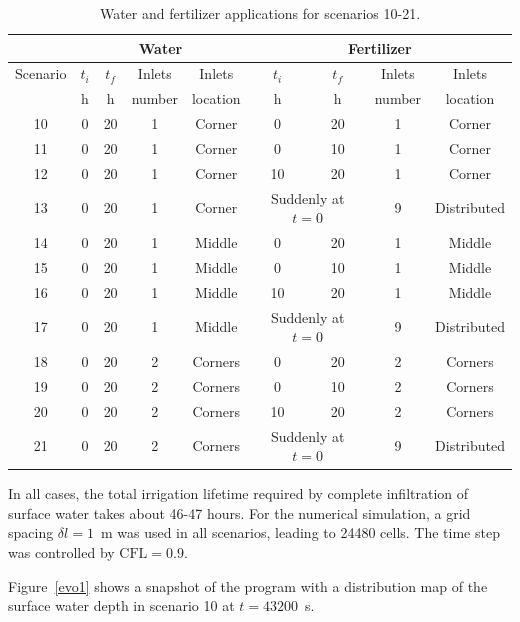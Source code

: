 \documentclass[review,authoryear]{elsarticle}
\begin{document}
\begin{table}[ht!]
\centering
\caption{Water and fertilizer applications for scenarios 10-21.
\label{TabNetwork}}
\footnotesize
\begin{tabular}{|c|cccc|cccc|}
\hline
&\multicolumn{4}{|c|}{Water}&\multicolumn{4}{|c|}{Fertilizer}\\
\hline
Scenario&$t_i$&$t_f$&Inlets&Inlets&$t_i$&$t_f$&Inlets&Inlets\\
&h&h&number&location&h&h&number&location\\
\hline
10&0&20&1&Corner&0&20&1&Corner\\
11&0&20&1&Corner&0&10&1&Corner\\
12&0&20&1&Corner&10&20&1&Corner\\
13&0&20&1&Corner&\multicolumn{2}{c}{Suddenly at $t=0$}&9&Distributed\\
14&0&20&1&Middle&0&20&1&Middle\\
15&0&20&1&Middle&0&10&1&Middle\\
16&0&20&1&Middle&10&20&1&Middle\\
17&0&20&1&Middle&\multicolumn{2}{c}{Suddenly at $t=0$}&9&Distributed\\
18&0&20&2&Corners&0&20&2&Corners\\
19&0&20&2&Corners&0&10&2&Corners\\
20&0&20&2&Corners&10&20&2&Corners\\
21&0&20&2&Corners&\multicolumn{2}{c}{Suddenly at $t=0$}&9&Distributed\\
\hline
\end{tabular}
\end{table}

In all cases, the total irrigation lifetime required by complete infiltration of
surface water takes about 46-47 hours. For the numerical simulation, a grid
spacing $\delta l=1$~m was used in all scenarios, leading to 24480 cells. The
time step was controlled by $\mathrm{CFL}=0.9$.

Figure~\ref{evo1} shows a snapshot of the program with a distribution map of the
surface water depth in scenario 10 at $t=43200$~s.
\end{document}
